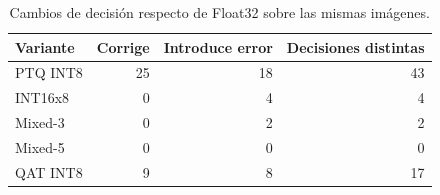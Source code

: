 \begin{table}[H]
\centering\small
\caption{Cambios de decisión respecto de Float32 sobre las mismas imágenes.}\label{tab:rx_pareadas}
\begin{tabularx}{\linewidth}{Yrrr}\toprule
Variante & Corrige & Introduce error & Decisiones distintas\\\midrule
PTQ INT8 & 25 & 18 & 43\\
INT16x8 & 0 & 4 & 4\\
Mixed-3 & 0 & 2 & 2\\
Mixed-5 & 0 & 0 & 0\\
QAT INT8 & 9 & 8 & 17\\
\bottomrule\end{tabularx}
\end{table}
